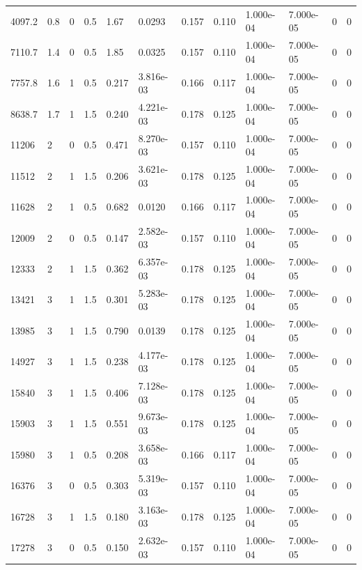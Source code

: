 \documentclass[preview]{standalone}
\begin{document}
{{\begin{tabular}{L{1.2cm}C{1.2cm} C{0.3cm}C{0.5cm} C{1.4cm}C{1.4cm} C{1.4cm}C{1.4cm} C{1.6cm}C{1.6cm} C{1.6cm}C{1.6cm}}
  4097.2  &   0.8  & 0     & 0.5 &  1.67  & 0.0293  &  0.157&   0.110& 1.000e-04 & 7.000e-05   &  0 & 0  \\ 
  7110.7  &   1.4  & 0     & 0.5 &  1.85  & 0.0325  &  0.157&   0.110& 1.000e-04 & 7.000e-05   &  0 & 0  \\ 
  7757.8  &   1.6  & 1     & 0.5 &  0.217  & 3.816e-03  &  0.166&   0.117& 1.000e-04 & 7.000e-05   &  0 & 0  \\ 
  8638.7  &   1.7  & 1     & 1.5 &  0.240  & 4.221e-03  &  0.178&   0.125& 1.000e-04 & 7.000e-05   &  0 & 0  \\ 
  11206  &     2  & 0     & 0.5 &  0.471  & 8.270e-03  &  0.157&   0.110& 1.000e-04 & 7.000e-05   &  0 & 0  \\ 
  11512  &     2  & 1     & 1.5 &  0.206  & 3.621e-03  &  0.178&   0.125& 1.000e-04 & 7.000e-05   &  0 & 0  \\ 
  11628  &     2  & 1     & 0.5 &  0.682  & 0.0120  &  0.166&   0.117& 1.000e-04 & 7.000e-05   &  0 & 0  \\ 
  12009  &     2  & 0     & 0.5 &  0.147  & 2.582e-03  &  0.157&   0.110& 1.000e-04 & 7.000e-05   &  0 & 0  \\ 
  12333  &     2  & 1     & 1.5 &  0.362  & 6.357e-03  &  0.178&   0.125& 1.000e-04 & 7.000e-05   &  0 & 0  \\ 
  13421  &     3  & 1     & 1.5 &  0.301  & 5.283e-03  &  0.178&   0.125& 1.000e-04 & 7.000e-05   &  0 & 0  \\ 
  13985  &     3  & 1     & 1.5 &  0.790  & 0.0139  &  0.178&   0.125& 1.000e-04 & 7.000e-05   &  0 & 0  \\ 
  14927  &     3  & 1     & 1.5 &  0.238  & 4.177e-03  &  0.178&   0.125& 1.000e-04 & 7.000e-05   &  0 & 0  \\ 
  15840  &     3  & 1     & 1.5 &  0.406  & 7.128e-03  &  0.178&   0.125& 1.000e-04 & 7.000e-05   &  0 & 0  \\ 
  15903  &     3  & 1     & 1.5 &  0.551  & 9.673e-03  &  0.178&   0.125& 1.000e-04 & 7.000e-05   &  0 & 0  \\ 
  15980  &     3  & 1     & 0.5 &  0.208  & 3.658e-03  &  0.166&   0.117& 1.000e-04 & 7.000e-05   &  0 & 0  \\ 
  16376  &     3  & 0     & 0.5 &  0.303  & 5.319e-03  &  0.157&   0.110& 1.000e-04 & 7.000e-05   &  0 & 0  \\ 
  16728  &     3  & 1     & 1.5 &  0.180  & 3.163e-03  &  0.178&   0.125& 1.000e-04 & 7.000e-05   &  0 & 0  \\ 
  17278  &     3  & 0     & 0.5 &  0.150  & 2.632e-03  &  0.157&   0.110& 1.000e-04 & 7.000e-05   &  0 & 0  \\ 

\end{tabular}}}
\end{document}
